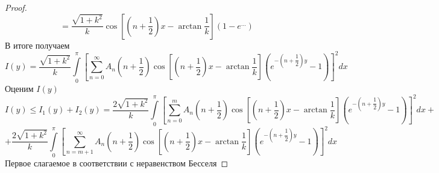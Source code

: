 \documentclass[10pt, a4paper]{extarticle}
\numberwithin{equation}{section}
\numberwithin{lemma}{section}
\numberwithin{definition}{section}
\numberwithin{notabene}{section}
\numberwithin{corollary}{section}
\begin{document}
\begin{proof}
\begin{equation*}
	= \dfrac{\sqrt{1+k^2}}{k} \cos{\left[\left(n +\dfrac12\right)x - \arctan{\dfrac{1}{k}}\right]} \left(1 - e^{\dots} \right)
\end{equation*}
В итоге получаем
	\begin{equation*}
		I(y) = \dfrac{\sqrt{1+k^2}}{k} \int\limits_0^\pi \left[\sum\limits_{n=0}^{\infty} A_n \left(n+\dfrac12\right) \cos{\left[\left(n +\dfrac12\right)x - \arctan{\dfrac{1}{k}}\right]} \left( e^{-\left(	n+\dfrac12\right)y} - 1\right)  \right]^2 dx
	\end{equation*}
Оценим $I(y)$
\begin{equation*}
	I(y) \leq I_1(y) + I_2(y)	= \dfrac{2\sqrt{1+k^2}}{k} \int\limits_0^\pi \left[\sum\limits_{n=0}^{m} A_n \left(n+\dfrac12\right) \cos{\left[\left(n +\dfrac12\right)x - \arctan{\dfrac{1}{k}}\right]} \left( e^{-\left(	n+\dfrac12\right)y} - 1\right)  \right]^2 dx + 
\end{equation*}
\begin{equation*}
		+ \dfrac{2\sqrt{1+k^2}}{k} \int\limits_0^\pi \left[\sum\limits_{n=m+1}^{\infty} A_n \left(n+\dfrac12\right) \cos{\left[\left(n +\dfrac12\right)x - \arctan{\dfrac{1}{k}}\right]} \left( e^{-\left(	n+\dfrac12\right)y} - 1\right)  \right]^2 dx 
\end{equation*}
Первое слагаемое в соответствии с неравенством Бесселя 

\end{proof}
\end{document}
